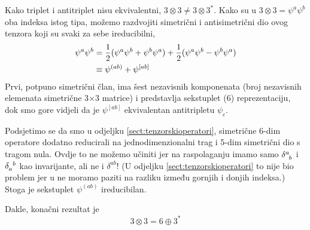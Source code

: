 \begin{primjer}[$3\otimes 3$]
Kako triplet i antitriplet nisu ekvivalentni, $3\otimes 3
\neq 3\otimes 3^*$. Kako su u
$3\otimes 3 = \psi^a \psi^b$ oba indeksa istog tipa,
možemo razdvojiti simetrični i antisimetrični dio ovog
tenzora koji su svaki za sebe ireducibilni,
\begin{align}
\psi^a \psi^b &= \frac{1}{2} (\psi^a\psi^b + \psi^b \psi^a)
               + \frac{1}{2} (\psi^a\psi^b - \psi^b \psi^a) \\
              &\equiv \psi^{(ab)} + \psi^{[ab]}
\end{align}
Prvi, potpuno simetrični član, ima šest nezavisnih komponenata
(broj nezavisnih elemenata simetrične 3$\times$3 matrice) i
predstavlja sekstuplet (6) reprezentaciju, dok smo gore
vidjeli da je $\psi^{[ab]}$ ekvivalentan antitripletu
$\psi_c$. 

Podsjetimo se da smo u odjeljku \ref{sect:tenzorskioperatori},
simetrične 6-dim operatore dodatno reducirali na jednodimenzionalni
trag i 5-dim simetrični dio s tragom nula.  Ovdje to ne možemo učiniti
jer na raspolaganju imamo samo 
$\tensor{\delta}{^a_b}$ i $\tensor{\delta}{_a^b}$ kao  invarijante, 
ali ne i $\delta^{ab}$! (U odjeljku \ref{sect:tenzorskioperatori}
to nije bio problem jer u
 ne moramo paziti na razliku između gornjih i donjih indeksa.)
Stoga je sekstuplet $\psi^{(ab)}$ ireducibilan.

Dakle, konačni rezultat je
\begin{equation}
 3 \otimes 3 = 6 \oplus 3^*
\label{eq:33eq63}
\end{equation}
\end{primjer}

